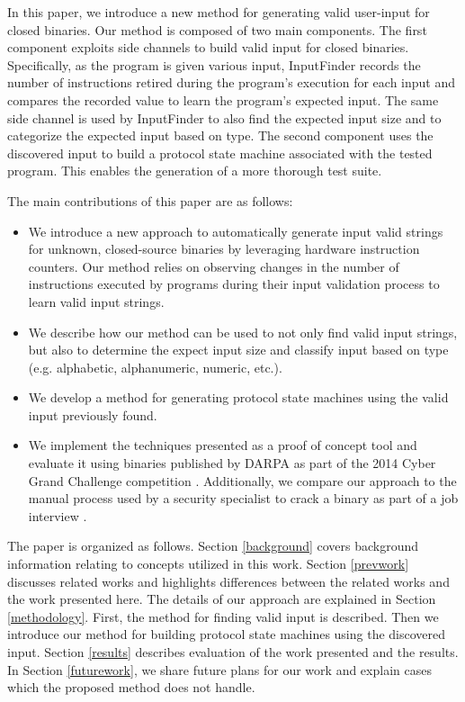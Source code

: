 \documentclass{acm_proc_article-sp}
\def \tool {InputFinder}
\begin{document}
In this paper, we introduce a new method for generating valid user-input for closed binaries. 
Our method is composed of two main components.
The first component exploits side channels to build valid input for closed binaries.
Specifically, as the program is given various input, \tool{} records the number of instructions retired during the program's execution for each input and compares the recorded value to learn the program's expected input.
The same side channel is used by \tool{} to also find the expected input size and to categorize the expected input based on type.
The second component uses the discovered input to build a protocol state machine associated with the tested program.
This enables the generation of a more thorough test suite.

The main contributions of this paper are as follows:
\begin{itemize}
	\item We introduce a new approach to automatically generate input valid strings for unknown, closed-source binaries by leveraging hardware instruction counters. Our method relies on observing changes in the number of instructions executed by programs during their input validation process to learn valid input strings.
	\item We describe how our method can be used to not only find valid input strings, but also to determine the expect input size and classify input based on type (e.g. alphabetic, alphanumeric, numeric, etc.).
	\item We develop a method for generating protocol state machines using the valid input previously found.
	\item We implement the techniques presented as a proof of concept tool and evaluate it using binaries published by DARPA as part of the 2014 Cyber Grand Challenge competition \cite{darpacgc}. Additionally, we compare our approach to the manual process used by a security specialist to crack a binary as part of a job interview \cite{interviewbinary}.
\end{itemize}

The paper is organized as follows.
Section \ref{background} covers background information relating to concepts utilized in this work.
Section \ref{prevwork} discusses related works and highlights differences between the related works and the work presented here.
The details of our approach are explained in Section \ref{methodology}. First, the method for finding valid input is described. Then we introduce our method for building protocol state machines using the discovered input.
Section \ref{results} describes evaluation of the work presented and the results.
In Section \ref{futurework}, we share future plans for our work and explain cases which the proposed method does not handle.
\end{document}
